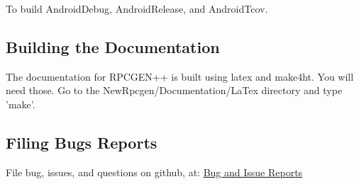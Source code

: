 To build AndroidDebug, AndroidRelease, and AndroidTcov.

\subsection{Building the Documentation}
The documentation for RPCGEN++ is built using latex and make4ht.
You will need those.
Go to the NewRpcgen/Documentation/LaTex directory
and type 'make'.

\subsection{Filing Bugs Reports}
File bug, issues, and questions on github, at:
\href {https://github.com/RiverExplorer/Phoenix/issues}{Bug and Issue Reports}
